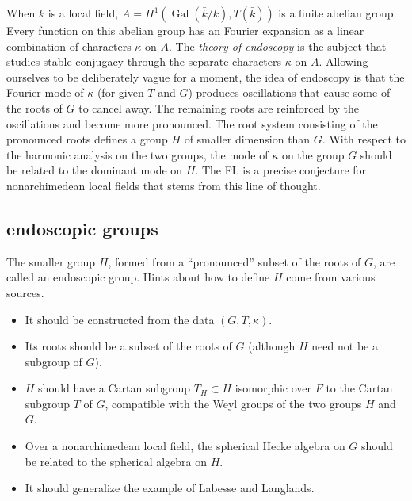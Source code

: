 \documentclass[brochure,english,12pt]{bourbaki}
\def\op#1{{\operatorname{#1}}}
\newcommand{\ring}[1]{\mathbb{#1}}
\begin{document}
When $k$ is a local field, $A=H^1(\op{Gal}(\bar k/k),T(\bar k))$ is a
finite abelian group.  Every function on this abelian group has an
Fourier expansion as a linear combination of characters $\kappa$ on
$A$.  
The {\it theory of endoscopy}
is the subject that studies stable conjugacy through the separate
characters $\kappa$ on $A$.  Allowing ourselves to be deliberately
vague for a moment, the idea of endoscopy is that the Fourier mode of
$\kappa$ (for given $T$ and $G$) produces oscillations that cause some
of the roots of $G$ to cancel away.  The remaining roots are
reinforced by the oscillations and become more pronounced.  The root
system consisting of the pronounced roots defines a group $H$ of smaller
dimension than $G$.  With respect to the harmonic analysis on the two
groups, the mode of $\kappa$ on the group $G$ should
be related to the dominant mode on $H$.  The FL is a precise
conjecture for nonarchimedean local fields that stems from this line of thought.





\subsection{endoscopic groups}\label{sec:endoscopy}

The smaller group $H$, formed from a ``pronounced'' subset of the roots of $G$, are called an endoscopic group.
Hints about how to define $H$ come from various sources.
\begin{itemize}
\item It should be constructed from the data $(G,T,\kappa)$.
\item Its roots should be a subset of the roots of $G$ (although $H$ need not
be a subgroup of $G$).
\item $H$ should have a Cartan subgroup $T_H\subset H$ isomorphic over $F$ to the Cartan subgroup
$T$ of $G$, compatible with the Weyl groups of the two groups $H$ and $G$.
\item Over a nonarchimedean local field, the spherical Hecke algebra on $G$ should be related to the
spherical algebra on $H$.
\item It should generalize the example of Labesse and Langlands.
\end{itemize}
\end{document}
